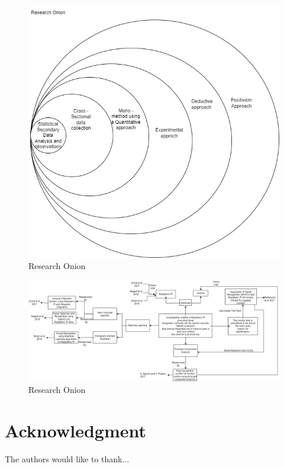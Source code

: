 \documentclass[journal]{IEEEtran}
\begin{document}
\begin{figure}[H]
    \centering
    \includegraphics[width=\columnwidth]{./images/ResearhOnion.png}
    \caption{Research Onion}
    \label{fig:my_label}
\end{figure}

\begin{figure}[H]
    \centering
    \includegraphics[width=\columnwidth]{./images/LiteratureMap.png}
    \caption{Research Onion}
    \label{fig:my_label}
\end{figure}
\section*{Acknowledgment}


The authors would like to thank...
\end{document}
